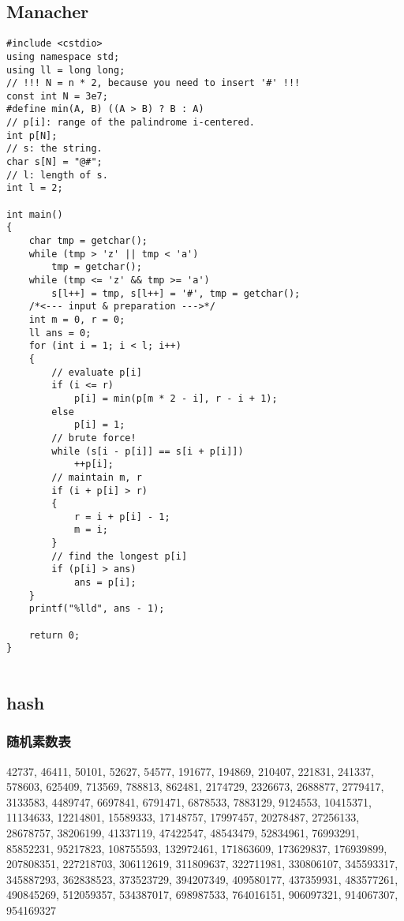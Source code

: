 \documentclass[]{article}
\begin{document}
\hypertarget{manacher}{%
\subsection{Manacher}\label{manacher}}

\begin{verbatim}
#include <cstdio>
using namespace std;
using ll = long long;
// !!! N = n * 2, because you need to insert '#' !!!
const int N = 3e7;
#define min(A, B) ((A > B) ? B : A)
// p[i]: range of the palindrome i-centered. 
int p[N];
// s: the string.
char s[N] = "@#";
// l: length of s.
int l = 2;

int main()
{
    char tmp = getchar();
    while (tmp > 'z' || tmp < 'a')
        tmp = getchar();
    while (tmp <= 'z' && tmp >= 'a')
        s[l++] = tmp, s[l++] = '#', tmp = getchar();
    /*<--- input & preparation --->*/
    int m = 0, r = 0;
    ll ans = 0;
    for (int i = 1; i < l; i++)
    {
        // evaluate p[i]
        if (i <= r)
            p[i] = min(p[m * 2 - i], r - i + 1);
        else
            p[i] = 1;
        // brute force!
        while (s[i - p[i]] == s[i + p[i]])
            ++p[i];
        // maintain m, r
        if (i + p[i] > r)
        {
            r = i + p[i] - 1;
            m = i;
        }
        // find the longest p[i]
        if (p[i] > ans)
            ans = p[i]; 
    }
    printf("%lld", ans - 1);

    return 0;
}
    
\end{verbatim}

\hypertarget{hash}{%
\subsection{hash}\label{hash}}

\hypertarget{ux968fux673aux7d20ux6570ux8868}{%
\subsubsection{随机素数表}\label{ux968fux673aux7d20ux6570ux8868}}

42737, 46411, 50101, 52627, 54577, 191677, 194869, 210407, 221831,
241337, 578603, 625409, 713569, 788813, 862481, 2174729, 2326673,
2688877, 2779417, 3133583, 4489747, 6697841, 6791471, 6878533, 7883129,
9124553, 10415371, 11134633, 12214801, 15589333, 17148757, 17997457,
20278487, 27256133, 28678757, 38206199, 41337119, 47422547, 48543479,
52834961, 76993291, 85852231, 95217823, 108755593, 132972461, 171863609,
173629837, 176939899, 207808351, 227218703, 306112619, 311809637,
322711981, 330806107, 345593317, 345887293, 362838523, 373523729,
394207349, 409580177, 437359931, 483577261, 490845269, 512059357,
534387017, 698987533, 764016151, 906097321, 914067307, 954169327
\end{document}
